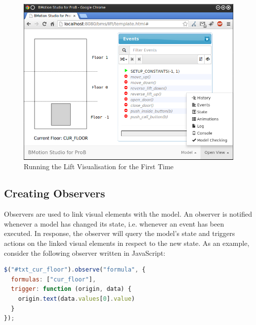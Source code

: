 \begin{figure}[!ht]
\begin{center}
	\includegraphics[width=12cm]{img/tutorial/tut_03.png}
	\caption{Running the Lift Visualisation for the First Time}
	\label{fig_tut_03_running1}
\end{center}
\end{figure}

\subsection{Creating Observers}
\label{sec_creation_observers}

Observers are used to link visual elements with the model. 
An observer is notified whenever a model has changed its state, i.e. whenever an event has been executed. 
In response, the observer will query the model's state and triggers actions on the linked visual elements in respect to the new state.
As an example, consider the following observer written in JavaScript:

\begin{lstlisting}[language=JavaScript, caption={Formula Observer Displaying the Current Floor (JavaScript)}]
$("#txt_cur_floor").observe("formula", {
  formulas: ["cur_floor"],
  trigger: function (origin, data) {
    origin.text(data.values[0].value)
  }
});
\end{lstlisting}

